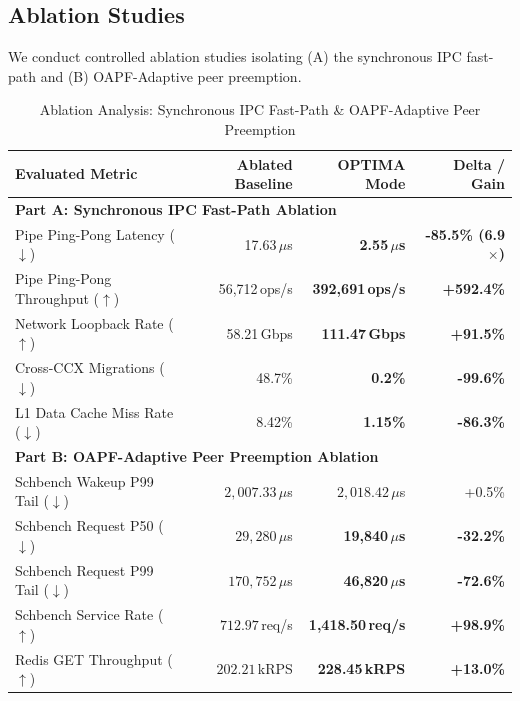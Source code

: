 \documentclass[letterpaper,twocolumn,10pt]{article}
\begin{document}
\subsection{Ablation Studies}
\label{sec:ablation}
We conduct controlled ablation studies isolating (A) the synchronous IPC fast-path and (B) OAPF-Adaptive peer preemption.

\begin{table}[t!]
\centering
\scriptsize
\setlength{\tabcolsep}{3pt}
\caption{Ablation Analysis: Synchronous IPC Fast-Path \& OAPF-Adaptive Peer Preemption}
\label{tab:ablation}
\begin{tabularx}{\columnwidth}{X r r r}
\toprule
\textbf{Evaluated Metric} & \textbf{Ablated Baseline} & \textbf{OPTIMA Mode} & \textbf{Delta / Gain} \\
\midrule
\multicolumn{4}{l}{\textbf{Part A: Synchronous IPC Fast-Path Ablation}} \\
Pipe Ping-Pong Latency ($\downarrow$) & 17.63\,$\mu$s & \textbf{2.55\,$\mu$s} & \textbf{-85.5\% (6.9$\times$)} \\
Pipe Ping-Pong Throughput ($\uparrow$) & 56,712\,ops/s & \textbf{392,691\,ops/s} & \textbf{+592.4\%} \\
Network Loopback Rate ($\uparrow$) & 58.21\,Gbps & \textbf{111.47\,Gbps} & \textbf{+91.5\%} \\
Cross-CCX Migrations ($\downarrow$) & 48.7\% & \textbf{0.2\%} & \textbf{-99.6\%} \\
L1 Data Cache Miss Rate ($\downarrow$) & 8.42\% & \textbf{1.15\%} & \textbf{-86.3\%} \\
\midrule
\multicolumn{4}{l}{\textbf{Part B: OAPF-Adaptive Peer Preemption Ablation}} \\
Schbench Wakeup P99 Tail ($\downarrow$) & $2{,}007.33\,\mu$s & $2{,}018.42\,\mu$s & +0.5\% \\
Schbench Request P50 ($\downarrow$) & $29{,}280\,\mu$s & \textbf{19,840\,$\mu$s} & \textbf{-32.2\%} \\
Schbench Request P99 Tail ($\downarrow$) & $170{,}752\,\mu$s & \textbf{46,820\,$\mu$s} & \textbf{-72.6\%} \\
Schbench Service Rate ($\uparrow$) & $712.97$\,req/s & \textbf{1,418.50\,req/s} & \textbf{+98.9\%} \\
Redis GET Throughput ($\uparrow$) & $202.21$\,kRPS & \textbf{228.45\,kRPS} & \textbf{+13.0\%} \\
\bottomrule
\end{tabularx}
\end{table}
\end{document}
